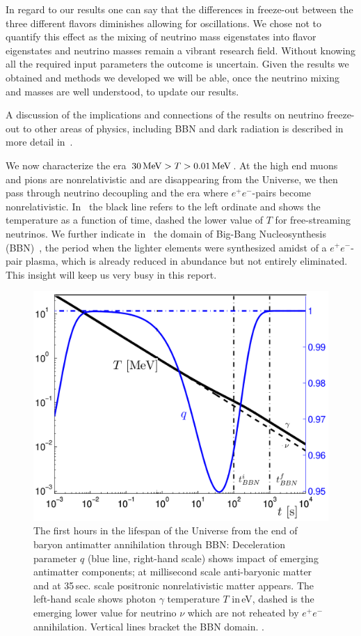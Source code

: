 In regard to our results one can say that the differences in freeze-out between the three different flavors diminishes allowing for oscillations. We chose not to quantify this effect as the mixing of neutrino mass eigenstates into flavor eigenstates and neutrino masses remain a vibrant research field. Without knowing all the required input parameters the outcome is uncertain. Given the results we obtained and methods we developed we will be able, once the neutrino mixing and masses are well understood, to update our results. 

A discussion of the implications and connections of the results on neutrino freeze-out to other areas of physics, including BBN and dark radiation is described in more detail in~\cite{Birrell:2014uka,Dreiner:2011fp,Boehm:2012gr,Blennow:2012de}. 

We now characterize the era $30\text{\,MeV}>T>0.01\text{\,MeV}$. At the high end muons and pions are nonrelativistic and are disappearing from the Universe, we then pass through neutrino decoupling and the era where $e^+e^-$-pairs become nonrelativistic. In~ the black line refers to the left ordinate and shows the temperature as a function of time, dashed the lower value of $T$ for free-streaming neutrinos. We further indicate in~ the domain of Big-Bang Nucleosynthesis (BBN)~\cite{Iocco:2008va}, the period when the lighter elements were synthesized amidst of a $e^+e^-$-pair plasma, which is already reduced in abundance but not entirely eliminated. This insight will keep us very busy in this report. 


\begin{figure}
\centerline{\includegraphics[width=0.60\linewidth]{plots/TqBBN.png}}
\caption{The first hours in the lifespan of the Universe from the end of baryon antimatter annihilation through BBN: Deceleration parameter $q$ (blue line, right-hand scale) shows impact of emerging antimatter components; at millisecond scale anti-baryonic matter and at 35\,sec. scale positronic nonrelativistic matter appears. The left-hand scale shows photon $\gamma$ temperature $T$ in\,eV, dashed is the emerging lower value for neutrino $\nu$ which are not reheated by $e^+e^-$ annihilation. Vertical lines bracket the BBN domain. . } 
\label{fig:BBN}
\end{figure}

